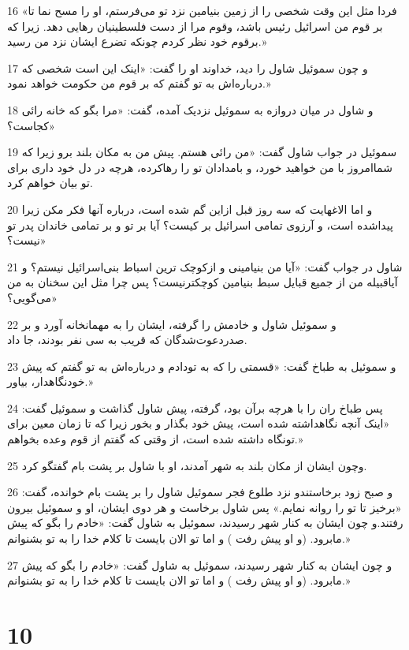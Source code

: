 \par 16 «فردا مثل این وقت شخصی را از زمین بنیامین نزد تو می‌فرستم، او را مسح نما تا بر قوم من اسرائیل رئیس باشد، وقوم مرا از دست فلسطینیان رهایی دهد. زیرا که برقوم خود نظر کردم چونکه تضرع ایشان نزد من رسید.»
\par 17 و چون سموئیل شاول را دید، خداوند او را گفت: «اینک این است شخصی که درباره‌اش به تو گفتم که بر قوم من حکومت خواهد نمود.»
\par 18 و شاول در میان دروازه به سموئیل نزدیک آمده، گفت: «مرا بگو که خانه رائی کجاست؟»
\par 19 سموئیل در جواب شاول گفت: «من رائی هستم. پیش من به مکان بلند برو زیرا که شماامروز با من خواهید خورد، و بامدادان تو را رهاکرده، هرچه در دل خود داری برای تو بیان خواهم کرد.
\par 20 و اما الاغهایت که سه روز قبل ازاین گم شده است، درباره آنها فکر مکن زیرا پیداشده است، و آرزوی تمامی اسرائیل بر کیست؟ آیا بر تو و بر تمامی خاندان پدر تو نیست؟»
\par 21 شاول در جواب گفت: «آیا من بنیامینی و ازکوچک ترین اسباط بنی‌اسرائیل نیستم؟ و آیاقبیله من از جمیع قبایل سبط بنیامین کوچکترنیست؟ پس چرا مثل این سخنان به من می‌گویی؟»
\par 22 و سموئیل شاول و خادمش را گرفته، ایشان را به مهمانخانه آورد و بر صدردعوت‌شدگان که قریب به سی نفر بودند، جا داد.
\par 23 و سموئیل به طباخ گفت: «قسمتی را که به تودادم و درباره‌اش به تو گفتم که پیش خودنگاهدار، بیاور.»
\par 24 پس طباخ ران را با هرچه برآن بود، گرفته، پیش شاول گذاشت و سموئیل گفت: «اینک آنچه نگاهداشته شده است، پیش خود بگذار و بخور زیرا که تا زمان معین برای تونگاه داشته شده است، از وقتی که گفتم از قوم وعده بخواهم.»
\par 25 وچون ایشان از مکان بلند به شهر آمدند، او با شاول بر پشت بام گفتگو کرد.
\par 26 و صبح زود برخاستندو نزد طلوع فجر سموئیل شاول را بر پشت بام خوانده، گفت: «برخیز تا تو را روانه نمایم.» پس شاول برخاست و هر دوی ایشان، او و سموئیل بیرون رفتند.و چون ایشان به کنار شهر رسیدند، سموئیل به شاول گفت: «خادم را بگو که پیش مابرود. (و او پیش رفت ) و اما تو الان بایست تا کلام خدا را به تو بشنوانم.»
\par 27 و چون ایشان به کنار شهر رسیدند، سموئیل به شاول گفت: «خادم را بگو که پیش مابرود. (و او پیش رفت ) و اما تو الان بایست تا کلام خدا را به تو بشنوانم.»
 
\chapter{10}

